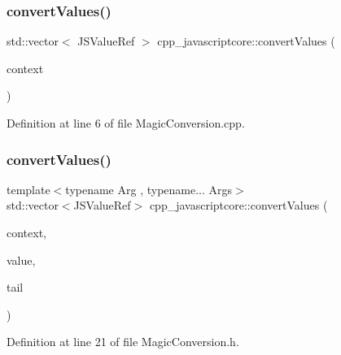 \mbox{\label{namespacecpp__javascriptcore_a5d52cd145305a6c024858e80973867e5}} 
\subsubsection{\texorpdfstring{convert\+Values()}{convertValues()}\hspace{0.1cm}{\footnotesize\ttfamily [1/2]}}
{\footnotesize\ttfamily std\+::vector$<$ J\+S\+Value\+Ref $>$ cpp\+\_\+javascriptcore\+::convert\+Values (\begin{DoxyParamCaption}\item[{J\+S\+Context\+Ref}]{context }\end{DoxyParamCaption})}



Definition at line 6 of file Magic\+Conversion.\+cpp.

\mbox{\label{namespacecpp__javascriptcore_ad53bb2850a23b75e56b6d953fc90b552}} 
\subsubsection{\texorpdfstring{convert\+Values()}{convertValues()}\hspace{0.1cm}{\footnotesize\ttfamily [2/2]}}
{\footnotesize\ttfamily template$<$typename Arg , typename... Args$>$ \\
std\+::vector$<$J\+S\+Value\+Ref$>$ cpp\+\_\+javascriptcore\+::convert\+Values (\begin{DoxyParamCaption}\item[{J\+S\+Context\+Ref}]{context,  }\item[{Arg}]{value,  }\item[{Args...}]{tail }\end{DoxyParamCaption})}



Definition at line 21 of file Magic\+Conversion.\+h.

\mbox{\label{namespacecpp__javascriptcore_a63b8017b1766288a57631889bd4d205c}} 
